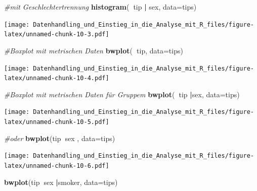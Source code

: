 \documentclass[10pt,ngerman,onside]{article}
\newenvironment{Shaded}{\begin{snugshade}}{\end{snugshade}}
\newcommand{\KeywordTok}[1]{\textcolor[rgb]{0.13,0.29,0.53}{\textbf{#1}}}
\newcommand{\DataTypeTok}[1]{\textcolor[rgb]{0.13,0.29,0.53}{#1}}
\newcommand{\StringTok}[1]{\textcolor[rgb]{0.31,0.60,0.02}{#1}}
\newcommand{\CommentTok}[1]{\textcolor[rgb]{0.56,0.35,0.01}{\textit{#1}}}
\newcommand{\OperatorTok}[1]{\textcolor[rgb]{0.81,0.36,0.00}{\textbf{#1}}}
\newcommand{\NormalTok}[1]{#1}
\begin{document}
\begin{Shaded}
\begin{Highlighting}[]
\CommentTok{#mit Geschlechtertrennung}
\KeywordTok{histogram}\NormalTok{(}\OperatorTok{~}\NormalTok{tip }\OperatorTok{|}\StringTok{ }\NormalTok{sex, }\DataTypeTok{data=}\NormalTok{tips)}
\end{Highlighting}
\end{Shaded}

\texttt{[image: Datenhandling\_und\_Einstieg\_in\_die\_Analyse\_mit\_R\_files/figure-latex/unnamed-chunk-10-3.pdf]}

\begin{Shaded}
\begin{Highlighting}[]
\CommentTok{#Boxplot mit metrischen Daten}
\KeywordTok{bwplot}\NormalTok{(}\OperatorTok{~}\NormalTok{tip, }\DataTypeTok{data=}\NormalTok{tips)}
\end{Highlighting}
\end{Shaded}

\texttt{[image: Datenhandling\_und\_Einstieg\_in\_die\_Analyse\_mit\_R\_files/figure-latex/unnamed-chunk-10-4.pdf]}

\begin{Shaded}
\begin{Highlighting}[]
\CommentTok{#Boxplot mit metrischen Daten für Gruppem}
\KeywordTok{bwplot}\NormalTok{(}\OperatorTok{~}\NormalTok{tip }\OperatorTok{|}\NormalTok{sex, }\DataTypeTok{data=}\NormalTok{tips)}
\end{Highlighting}
\end{Shaded}

\texttt{[image: Datenhandling\_und\_Einstieg\_in\_die\_Analyse\_mit\_R\_files/figure-latex/unnamed-chunk-10-5.pdf]}

\begin{Shaded}
\begin{Highlighting}[]
\CommentTok{#oder}
\KeywordTok{bwplot}\NormalTok{(tip}\OperatorTok{~}\NormalTok{sex , }\DataTypeTok{data=}\NormalTok{tips)}
\end{Highlighting}
\end{Shaded}

\texttt{[image: Datenhandling\_und\_Einstieg\_in\_die\_Analyse\_mit\_R\_files/figure-latex/unnamed-chunk-10-6.pdf]}

\begin{Shaded}
\begin{Highlighting}[]
\KeywordTok{bwplot}\NormalTok{(tip}\OperatorTok{~}\NormalTok{sex }\OperatorTok{|}\NormalTok{smoker, }\DataTypeTok{data=}\NormalTok{tips)}
\end{Highlighting}
\end{Shaded}
\end{document}
